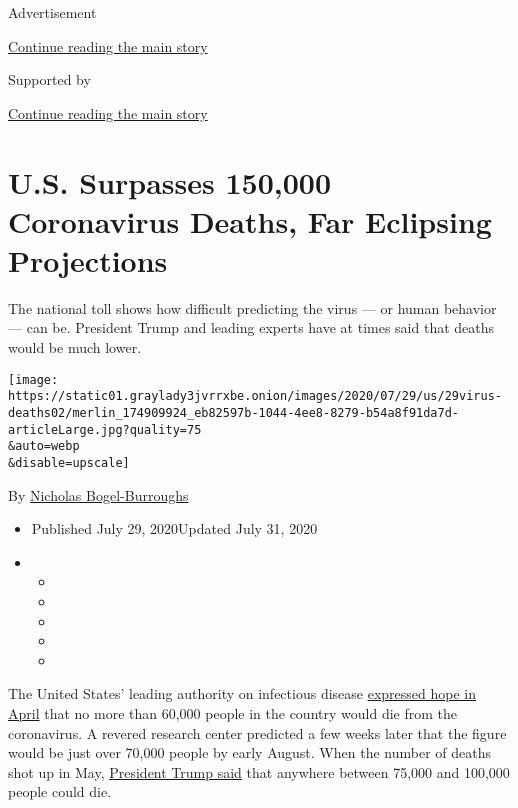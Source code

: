 Advertisement

\protect\hyperlink{after-top}{Continue reading the main story}

Supported by

\protect\hyperlink{after-sponsor}{Continue reading the main story}

\hypertarget{us-surpasses-150000-coronavirus-deaths-far-eclipsing-projections}{%
\section{U.S. Surpasses 150,000 Coronavirus Deaths, Far Eclipsing
Projections}\label{us-surpasses-150000-coronavirus-deaths-far-eclipsing-projections}}

The national toll shows how difficult predicting the virus --- or human
behavior --- can be. President Trump and leading experts have at times
said that deaths would be much lower.

\texttt{[image: https://static01.graylady3jvrrxbe.onion/images/2020/07/29/us/29virus-deaths02/merlin\_174909924\_eb82597b-1044-4ee8-8279-b54a8f91da7d-articleLarge.jpg?quality=75\\\&auto=webp\\\&disable=upscale]}

By
\href{https://www.nytimes3xbfgragh.onion/by/nicholas-bogel-burroughs}{Nicholas
Bogel-Burroughs}

\begin{itemize}
\item
  Published July 29, 2020Updated July 31, 2020
\item
  \begin{itemize}
  \item
  \item
  \item
  \item
  \item
  \end{itemize}
\end{itemize}

The United States' leading authority on infectious disease
\href{https://www.today.com/video/dr-anthony-fauci-virus-death-toll-may-be-more-like-60-000-than-100-000-to-200-000-81825861735}{expressed
hope in April} that no more than 60,000 people in the country would die
from the coronavirus. A revered research center predicted a few weeks
later that the figure would be just over 70,000 people by early August.
When the number of deaths shot up in May,
\href{https://www.nytimes3xbfgragh.onion/2020/05/03/us/politics/trump-coronavirus.html}{President
Trump said} that anywhere between 75,000 and 100,000 people could die.

